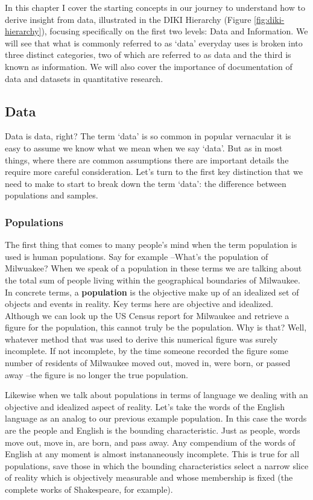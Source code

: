 \documentclass[
]{article}
\begin{document}
In this chapter I cover the starting concepts in our journey to understand how to derive insight from data, illustrated in the DIKI Hierarchy (Figure \ref{fig:diki-hierarchy}), focusing specifically on the first two levels: Data and Information. We will see that what is commonly referred to as `data' everyday uses is broken into three distinct categories, two of which are referred to as data and the third is known as information. We will also cover the importance of documentation of data and datasets in quantitative research.

\hypertarget{data}{%
\subsection{Data}\label{data}}

Data is data, right? The term `data' is so common in popular vernacular it is easy to assume we know what we mean when we say `data'. But as in most things, where there are common assumptions there are important details the require more careful consideration. Let's turn to the first key distinction that we need to make to start to break down the term `data': the difference between populations and samples.

\hypertarget{populations}{%
\subsubsection{Populations}\label{populations}}

The first thing that comes to many people's mind when the term population is used is human populations. Say for example --What's the population of Milwuakee? When we speak of a population in these terms we are talking about the total sum of people living within the geographical boundaries of Milwaukee. In concrete terms, a \textbf{population} is the objective make up of an idealized set of objects and events in reality. Key terms here are objective and idealized. Although we can look up the US Census report for Milwaukee and retrieve a figure for the population, this cannot truly be the population. Why is that? Well, whatever method that was used to derive this numerical figure was surely incomplete. If not incomplete, by the time someone recorded the figure some number of residents of Milwaukee moved out, moved in, were born, or passed away --the figure is no longer the true population.

Likewise when we talk about populations in terms of language we dealing with an objective and idealized aspect of reality. Let's take the words of the English language as an analog to our previous example population. In this case the words are the people and English is the bounding characteristic. Just as people, words move out, move in, are born, and pass away. Any compendium of the words of English at any moment is almost instananeously incomplete. This is true for all populations, save those in which the bounding characteristics select a narrow slice of reality which is objectively measurable and whose membership is fixed (the complete works of Shakespeare, for example).
\end{document}
